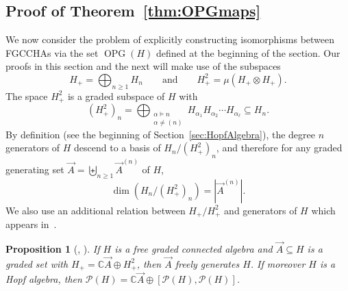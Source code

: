\documentclass[11pt]{amsart}
\newtheorem{proposition}[theorem]{Proposition}
\theoremstyle{definition}
\numberwithin{equation}{section}
\def\CC{{\mathbb C}}
\newcommand{\FGCCHAs}{\textsf{FGCCHA}s\xspace}
\newcommand{\OPG}{\operatorname{OPG}}
\begin{document}
\subsection{Proof of Theorem~\ref{thm:OPGmaps}}
\label{sec:OPGproof}

We now consider the problem of explicitly constructing isomorphisms between \FGCCHAs via the set $\OPG(H)$ defined at the beginning of the section.  Our proofs in this section and the next will make use of the subspaces
\[
H_{+} = \bigoplus_{n \geq 1} H_n
\qquad\text{and}\qquad 
H^{2}_{+} = \mu(H_{+} \otimes H_{+}).
\]
The space $H^{2}_{+}$ is a graded subspace of $H$ with
\begin{equation}
\label{eq:Hplusdef}
(H^{2}_{+})_{n} = \bigoplus_{\substack{\alpha \vDash n \\ \alpha \neq (n)}}
H_{\alpha_{1}} H_{\alpha_{2}}\cdots H_{\alpha_{\ell}} \subseteq H_{n}.
\end{equation}
By definition (see the beginning of Section~\ref{sec:HopfAlgebra}), the degree $n$ generators of $H$ descend to a basis of $H_{n}/ (H^{2}_{+})_{n}$, and therefore for any graded generating set $\vec{A} = \biguplus_{n \ge 1} \vec{A}^{(n)}$ of $H$, 
\[
\dim(H_{n}/(H^{2}_{+})_{n}) = |\vec{A}^{(n)}|.
\]
We also use an additional relation between $H_{+}/H^{2}_{+}$ and generators of $H$ which appears in~\cite{F23}.

\begin{proposition}[{\cite[Proposition 2.2 and 2.4]{F23}, \cite[Theorem 7.5]{MM65}}]
\label{prop:indecomposable generators}
If $H$ is a free graded connected algebra and $\vec{A} \subseteq H$ is a graded set with $H_{+} = \CC \vec{A} \oplus H_{+}^{2}$, then $\vec{A}$ freely generates $H$.  If moreover $H$ is a Hopf algebra, then $\mathcal{P}(H) = \CC \vec{A} \oplus [\mathcal{P}(H), \mathcal{P}(H)]$.
\end{proposition}
\end{document}
